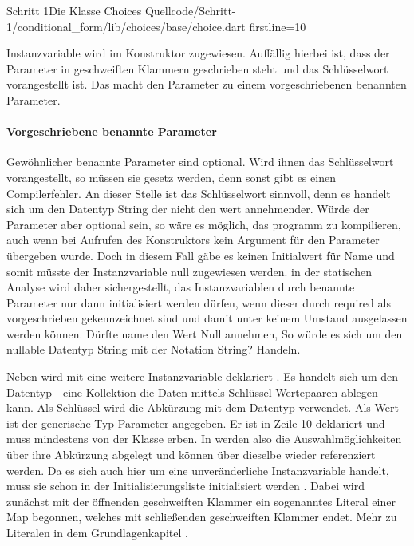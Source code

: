 \begin{alexlisting}{Schritt 1}{Die Klasse Choices}
  {Quellcode/Schritt-1/conditional_form/lib/choices/base/choice.dart}
  {firstline=10}
  \label{lst:Schritt1KlasseChoices}
\end{alexlisting}

Instanzvariable   wird im Konstruktor  zugewiesen. Auffällig hierbei ist, dass der Parameter in geschweiften Klammern geschrieben steht und das Schlüsselwort   vorangestellt ist. Das macht den Parameter zu einem vorgeschriebenen benannten Parameter.

\paragraph{Vorgeschriebene benannte Parameter}

Gewöhnlicher benannte Parameter sind optional. Wird ihnen das Schlüsselwort  vorangestellt, so müssen sie gesetz werden, denn sonst gibt es einen Compilerfehler. An dieser Stelle ist das  Schlüsselwort sinnvoll, denn es handelt sich um den Datentyp String der nicht den  wert  annehmender. Würde  der Parameter aber optional sein, so wäre es möglich, das programm zu kompilieren, auch wenn bei Aufrufen des Konstruktors kein Argument für den Parameter übergeben wurde. Doch in diesem Fall gäbe es keinen Initialwert für Name und somit müsste der  Instanzvariable null  zugewiesen werden. in der statischen Analyse wird daher sichergestellt, das Instanzvariablen durch benannte Parameter nur dann initialisiert werden dürfen, wenn dieser durch required  als vorgeschrieben gekennzeichnet sind und damit unter keinem Umstand ausgelassen werden können. Dürfte name den Wert Null annehmen, So würde es sich um den nullable Datentyp String  mit der Notation String? Handeln.

Neben  wird mit  eine weitere Instanzvariable deklariert .
Es handelt sich um den Datentyp  - eine Kollektion die Daten mittels Schlüssel Wertepaaren ablegen kann. Als Schlüssel wird die Abkürzung mit dem Datentyp  verwendet. Als Wert ist der generische Typ-Parameter  angegeben. Er ist in Zeile 10 deklariert und muss mindestens von der Klasse  erben. In  werden also die Auswahlmöglichkeiten über  ihre Abkürzung abgelegt und können über dieselbe wieder referenziert werden.  Da es sich auch hier um eine unveränderliche Instanzvariable handelt, muss sie schon in der Initialisierungsliste initialisiert werden . Dabei wird zunächst mit der öffnenden geschweiften Klammer  ein sogenanntes Literal einer Map  begonnen, welches mit schließenden geschweiften Klammer  endet. Mehr zu  Literalen in dem Grundlagenkapitel .



